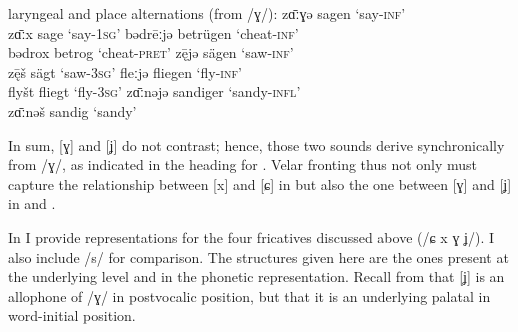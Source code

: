 \ea%
\label{ex:10:19} laryngeal and place alternations (from /ɣ/):
\ea\label{ex:10:19a} zɑ̄ːɣǝ \tab [zɑːɣǝ] \tab sagen \tab ‘say-\textsc{inf}’  \\
    zɑ̄ːx \tab [zɑːx] \tab sage \tab ‘say-\textsc{1sg}’ 
\ex\label{ex:10:19b} bǝdrēːjǝ \tab [bǝdreːʝǝ] \tab betrügen \tab ‘cheat-\textsc{inf}’ \\
    bǝdrox \tab [bǝdrox] \tab betrog \tab ‘cheat-\textsc{pret}’ 
\ex\label{ex:10:19c} z\={ę}jǝ \tab [zɛːʝǝ] \tab sägen \tab ‘saw-\textsc{inf}’ \\
    z\={ę}š \tab [zɛːɕ] \tab sägt \tab ‘saw-\textsc{3sg}’ 
\ex\label{ex:10:19d} fleːjǝ \tab [fleːʝǝ] \tab fliegen \tab ‘fly-\textsc{inf}’ \\
    flyšt \tab [flyɕt] \tab fliegt \tab ‘fly-\textsc{3sg}’ 
\ex\label{ex:10:19e} zɑ̄ːnǝjǝ \tab [zɑːnǝʝǝ] \tab sandiger \tab ‘sandy-\textsc{infl}’ \\
    zɑ̄ːnǝš \tab [zɑːnǝɕ] \tab sandig \tab ‘sandy’ 
    \z
\z 

In sum, [ɣ] and [ʝ] do not contrast; hence, those two sounds derive synchronically from /ɣ/, as indicated in the heading for . Velar fronting thus not only must capture the relationship between [x] and [ɕ] in  but also the one between [ɣ] and [ʝ] in  and .

In  I provide representations for the four fricatives discussed above (/ɕ x ɣ ʝ/). I also include /s/ for comparison. The structures given here are the ones present at the underlying level and in the phonetic representation. Recall from  that [ʝ] is an allophone of /ɣ/ in postvocalic position, but that it is an underlying palatal in word-initial position.


\ea\label{ex:10:20}

